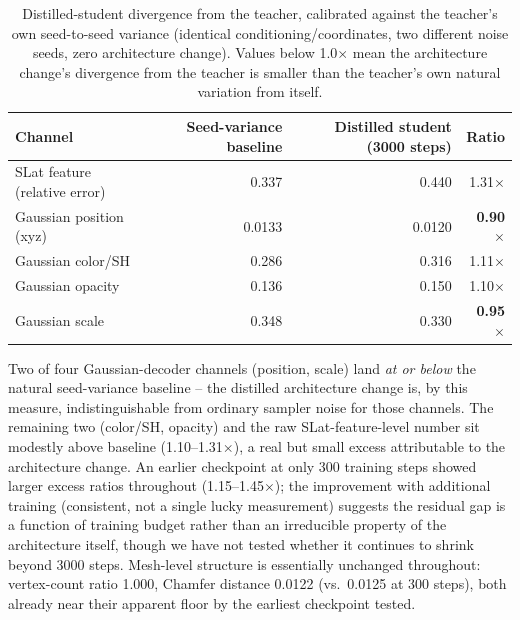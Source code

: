 \documentclass[11pt]{article}
\begin{document}
\begin{table}[t]
    \centering
    \caption{Distilled-student divergence from the teacher, calibrated against the teacher's own
    seed-to-seed variance (identical conditioning/coordinates, two different noise seeds, zero
    architecture change). Values below 1.0$\times$ mean the architecture change's divergence from
    the teacher is smaller than the teacher's own natural variation from itself.}
    \label{tab:quality}
    \begin{tabular}{@{}lrrr@{}}
        \toprule
        Channel & Seed-variance baseline & Distilled student (3000 steps) & Ratio \\
        \midrule
        SLat feature (relative error) & 0.337 & 0.440 & 1.31$\times$ \\
        Gaussian position (xyz) & 0.0133 & 0.0120 & \textbf{0.90$\times$} \\
        Gaussian color/SH & 0.286 & 0.316 & 1.11$\times$ \\
        Gaussian opacity & 0.136 & 0.150 & 1.10$\times$ \\
        Gaussian scale & 0.348 & 0.330 & \textbf{0.95$\times$} \\
        \bottomrule
    \end{tabular}
\end{table}

Two of four Gaussian-decoder channels (position, scale) land \emph{at or below} the natural
seed-variance baseline -- the distilled architecture change is, by this measure, indistinguishable
from ordinary sampler noise for those channels. The remaining two (color/SH, opacity) and the raw
SLat-feature-level number sit modestly above baseline (1.10--1.31$\times$), a real but small excess
attributable to the architecture change. An earlier checkpoint at only 300 training steps showed
larger excess ratios throughout (1.15--1.45$\times$); the improvement with additional training
(consistent, not a single lucky measurement) suggests the residual gap is a function of training
budget rather than an irreducible property of the architecture itself, though we have not tested
whether it continues to shrink beyond 3000 steps. Mesh-level structure is essentially unchanged
throughout: vertex-count ratio 1.000, Chamfer distance 0.0122 (vs.\ 0.0125 at 300 steps), both
already near their apparent floor by the earliest checkpoint tested.
\end{document}
